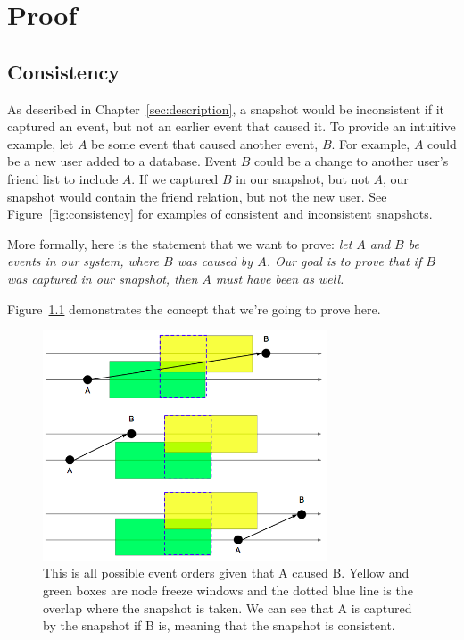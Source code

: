 \chapter{Proof}
\label{sec:proof}


\section{Consistency}

As described in Chapter~\ref{sec:description}, a snapshot would be
inconsistent if it captured an event, but not an earlier event that
caused it. To provide an intuitive example, let $A$ be some event that
caused another event, $B$.  For example, $A$ could be a new user added
to a database. Event $B$ could be a change to another user's friend list to
include $A$. If we captured $B$ in our snapshot, but not $A$, our
snapshot would contain the friend relation, but not the new user. See 
Figure~\ref{fig:consistency} for examples of consistent and inconsistent
snapshots.

More formally, here is the statement that we want to prove: {\em let $A$ and $B$ be events in our system, where $B$ was caused by
$A$. Our goal is to prove that if $B$ was captured in our snapshot, then $A$ must have been as well.}

Figure~\ref{fig:consistentoverlap} demonstrates the concept that we're going
to prove here.

\begin{figure}[!htbp]
  \centering
  \caption{This is all possible event orders given that A caused B. Yellow and green boxes are node freeze windows and the dotted blue line is the overlap where the snapshot is taken. We can see that A is captured by the snapshot if B is, meaning that the snapshot is consistent.} 
  \label{fig:consistentoverlap}
  \includegraphics[width=0.75\textwidth]{consistentoverlap.png}
\end{figure}

